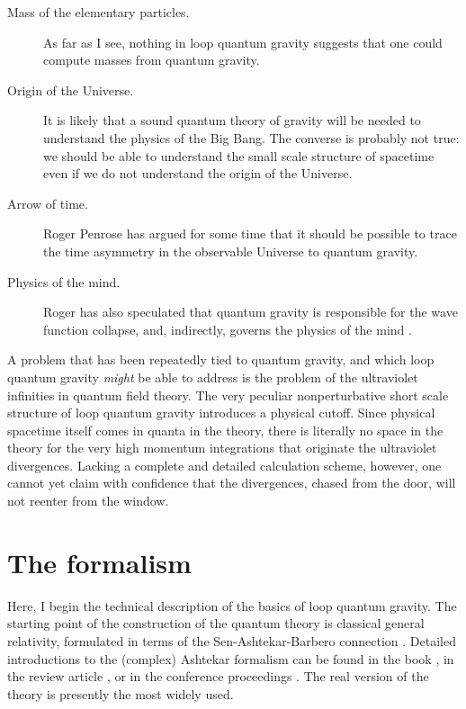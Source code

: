 \begin{description}
	\item[Mass of the elementary particles.]  As far as I see, 
	nothing in loop quantum gravity suggests that one could compute 
	masses from quantum gravity. 

	\item[Origin of the Universe.]  It is likely that a sound 
	quantum theory of gravity will be needed to understand the 
	physics of the Big Bang.  The converse is probably not true: 
	we should be able to understand the small scale structure of 
	spacetime even if we do not understand the origin of the 
	Universe.

	\item[Arrow of time.] Roger Penrose has argued for some time 
	that it should be possible to trace the time asymmetry in the 
	observable Universe to quantum gravity. 

	\item[Physics of the mind.]  Roger has also speculated 
	that quantum gravity is responsible for the wave function 
	collapse, and, indirectly, governs the physics of the mind 
	\cite{PenroseBook}. 
		  
\end{description}

A problem that has been repeatedly tied to quantum gravity, and 
which loop quantum gravity {\em might\/} be able to address is 
the problem of the ultraviolet infinities in quantum field 
theory.  The very peculiar nonperturbative short scale structure 
of loop quantum gravity introduces a physical cutoff.  Since 
physical spacetime itself comes in quanta in the theory, there is 
literally no space in the theory for the very high momentum 
integrations that originate the ultraviolet divergences.  Lacking 
a complete and detailed calculation scheme, however, one cannot 
yet claim with confidence that the divergences, chased from the 
door, will not reenter from the window.

\section{The formalism}\label{5}  

Here, I begin the technical description of the basics of loop 
quantum gravity.  The starting point of the construction of the 
quantum theory is classical general relativity, formulated in 
terms of the Sen-Ashtekar-Barbero connection 
\cite{Sen,Ashtekar86,Barbero3}.  Detailed introductions to the 
(complex) Ashtekar formalism can be found in the book 
\cite{AshtekarBook}, in the review article \cite{Rovelli91}, or 
in the conference proceedings \cite{Ehlers94}.  The real version 
of the theory is presently the most widely used.

